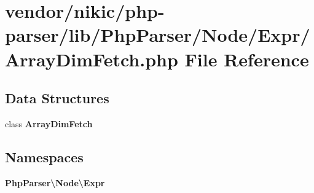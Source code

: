 \section{vendor/nikic/php-\/parser/lib/\+Php\+Parser/\+Node/\+Expr/\+Array\+Dim\+Fetch.php File Reference}
\label{_array_dim_fetch_8php}
\subsection*{Data Structures}
\begin{DoxyCompactItemize}
\item 
class {\bf Array\+Dim\+Fetch}
\end{DoxyCompactItemize}
\subsection*{Namespaces}
\begin{DoxyCompactItemize}
\item 
 {\bf Php\+Parser\textbackslash{}\+Node\textbackslash{}\+Expr}
\end{DoxyCompactItemize}

